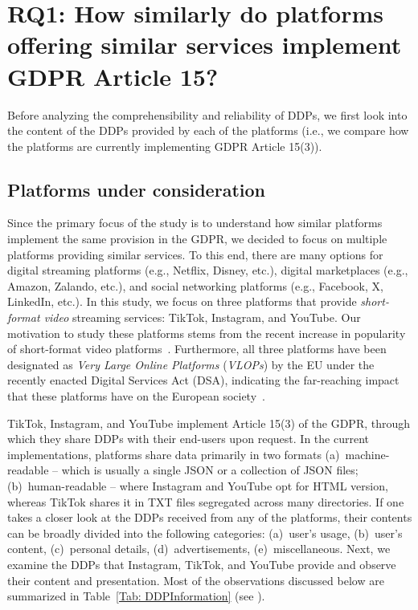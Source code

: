 \section{RQ1: How similarly do platforms offering similar services implement GDPR Article 15?}
\label{Sec: CurrentImp}

Before analyzing the comprehensibility and reliability of DDPs, we first look into the content of the DDPs provided by each of the platforms (i.e., we compare how the platforms are currently implementing GDPR Article 15(3)).
\subsection{Platforms under consideration}
\label{Sec: Platforms}

Since the primary focus of the study is to understand how similar platforms implement the same provision in the GDPR, we decided to focus on multiple platforms providing similar services. 
To this end, there are many options for digital streaming platforms (e.g., Netflix, Disney, etc.), digital marketplaces (e.g., Amazon, Zalando, etc.), and social networking platforms (e.g., Facebook, X, LinkedIn, etc.).
In this study, we focus on three platforms that provide \textit{short-format video} streaming services: TikTok, Instagram, and YouTube.
Our motivation to study these platforms stems from the recent increase in popularity of short-format video platforms~\cite{zannettou2024analyzing, Mousavi_Gummadi_Zannettou_2024}.
Furthermore, all three platforms have been designated as \textit{Very Large Online Platforms}  (\textit{VLOPs}) by the EU under the recently enacted Digital Services Act (DSA), indicating the far-reaching impact that these platforms have on the European society~\cite{DSA2023VLOP}. 

TikTok, Instagram, and YouTube implement Article 15(3) of the GDPR, through which they share DDPs with their end-users upon request.
In the current implementations, platforms share data primarily in two formats (a)~machine-readable -- which is usually a single JSON or a collection of JSON files; (b)~human-readable -- where Instagram and YouTube opt for HTML version, whereas TikTok shares it in TXT files segregated across many directories.
If one takes a closer look at the DDPs received from any of the platforms, their contents can be broadly divided into the following categories: (a)~user's usage, (b)~user's content, (c)~personal details, (d)~advertisements, (e)~miscellaneous.  
Next, we examine the DDPs that Instagram, TikTok, and YouTube provide and observe their content and presentation. Most of the observations discussed below are summarized in Table~\ref{Tab: DDPInformation} (see ).


